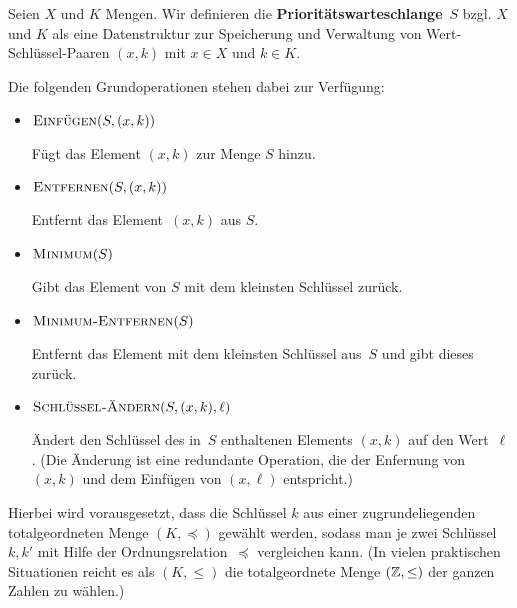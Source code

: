 \begin{defn}
	Seien $X$ und $K$ Mengen. 
	Wir definieren die \textbf{Prioritätswarteschlange}~$S$ bzgl. $X$ und $K$ als eine Datenstruktur zur Speicherung und Verwaltung von Wert-Schlüssel-Paaren $(x,k)$ mit $x \in X$ und $k \in K$.
	 
	 Die folgenden Grundoperationen stehen dabei zur Verfügung: 
%
\begin{itemize}
 \item $\mathop{\text{\textsc{Einf\"ugen}}}(S,(x,k))$
 
 Fügt das Element $(x,k)$ zur Menge $S$ hinzu.

 \item $\mathop{\text{\textsc{Entfernen}}}(S,(x,k))$
 
 Entfernt das Element~$(x,k)$ aus $S$.

 \item $\mathop{\text{\textsc{Minimum}}}(S)$
 
 Gibt das Element von $S$ mit dem kleinsten Schlüssel zurück.
 
 \item $\mathop{\text{\textsc{Minimum-Entfernen}}}(S)$
 
 Entfernt das Element mit dem kleinsten Schlüssel aus~$S$ und gibt dieses zurück.

 \item $\mathop{\text{\textsc{Schl\"u{\ss}el-\"Andern}}}(S,(x,k),\ell)$
 
 Ändert den Schlüssel des in~$S$ enthaltenen Elements $(x,k)$ auf den Wert~$\ell$.
 (Die Änderung ist eine redundante Operation, die der Enfernung von $(x,k)$ und dem Einfügen von $(x,\ell)$ entspricht.) 
\end{itemize}

%
\noindent Hierbei wird vorausgesetzt, dass die Schlüssel $k$ aus einer zugrundeliegenden totalgeordneten Menge $(K,\preceq)$ gewählt werden, sodass man je zwei Schlüssel $k,k'$ mit Hilfe der Ordnungsrelation~$\preceq$ vergleichen kann. (In vielen praktischen Situationen reicht es als $(K,\le)$ die totalgeordnete Menge $(\mathbb{Z},\le)$ der ganzen Zahlen zu wählen.)
\end{defn} 



